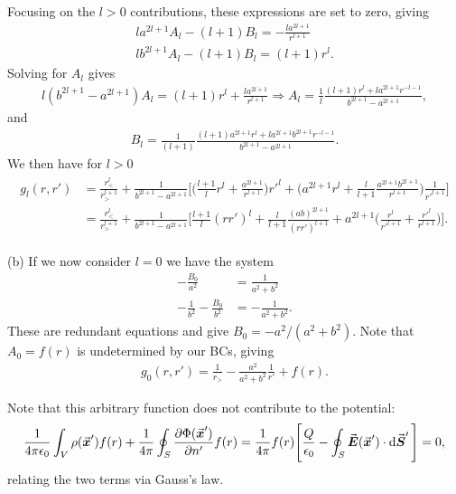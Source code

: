 {Focusing on the $l>0$ contributions, these expressions are set to zero, giving
\begin{align}
    l a^{2l+1} A_{l} - (l+1) B_{l} = -\frac{l a^{2l+1}}{r^{l+1}} \\
    l b^{2l+1} A_{l} - (l+1) B_{l} = (l+1) r^{l}
.\end{align}
Solving for $A_{l}$ gives
\begin{eqnarray}
    l(b^{2l+1} - a^{2l+1}) A_{l} = (l+1) r^{l} + \frac{la^{2l+1}}{r^{l+1}} \Rightarrow A_{l} = \frac{1}{l} \frac{(l+1) r^{l} + la^{2l+1} r^{-l-1}}{b^{2l+1} - a^{2l+1}}
,\end{eqnarray}
and
\begin{eqnarray}
    B_{l} = \frac{1}{(l+1)} \frac{(l+1) a^{2l+1} r^{l} + l a^{2l+1} b^{2l+1} r^{-l-1}}{b^{2l+1} - a^{2l+1}}
.\end{eqnarray}
We then have for $l > 0$
\begin{eqnarray}
\begin{aligned}
    g_{l}(r,r') &= \frac{r_{<}^{l}}{r_{>}^{l+1}} + \frac{1}{b^{2l+1} - a^{2l+1}} \Bigg[ \Big( \frac{l+1}{l} r^{l} + \frac{a^{2l+1}}{r^{l+1}} \Big) r'^{l} + \Big( a^{2l+1} r^{l} + \frac{l}{l+1} \frac{a^{2l+1}b^{2l+1}}{r^{l+1}} \Big) \frac{1}{r'^{l+1}} \Bigg] \\
                &= \frac{r_{<}^{l}}{r_{>}^{l+1}} + \frac{1}{b^{2l+1} - a^{2l+1}} \Bigg[ \frac{l+1}{l} (r r')^{l} + \frac{l}{l+1} \frac{(ab)^{2l+1}}{(r r')^{l+1}} + a^{2l+1} \Bigg( \frac{r^{l}}{r'^{l+1}} + \frac{r'^{l}}{r^{l+1}} \Bigg) \Bigg]
.\end{aligned}
\end{eqnarray}

(b) If we now consider $l = 0$ we have the system
\begin{align}
    -\frac{B_{0}}{a^2} &= \frac{1}{a^2 + b^2} \\
    -\frac{1}{b^2} - \frac{B_{0}}{b^2} &= -\frac{1}{a^2 + b^2}
.\end{align}
These are redundant equations and give $B_{0} = -a^2/(a^2 + b^2)$.
Note that $A_{0} = f(r)$ is undetermined by our BCs, giving
\begin{eqnarray}
    g_{0}(r,r') = \frac{1}{r_{>}} - \frac{a^2}{a^2 + b^2} \frac{1}{r'} + f(r)
.\end{eqnarray}

Note that this arbitrary function does not contribute to the potential:
\begin{eqnarray}
    \frac{1}{4 \pi \epsilon_0} \int_{V} \rho(\va*{x}') f(r) + \frac{1}{4\pi} \oint_{S} \pdv{\Phi(\va*{x}')}{n'} f(r) = \frac{1}{4\pi} f(r) \Bigg[ \frac{Q}{\epsilon_0} - \oint_{S} \va*{E}(\va*{x}') \cdot \dd{\va*{S}'} \Bigg] = 0
,\end{eqnarray}
relating the two terms via Gauss's law.

}


